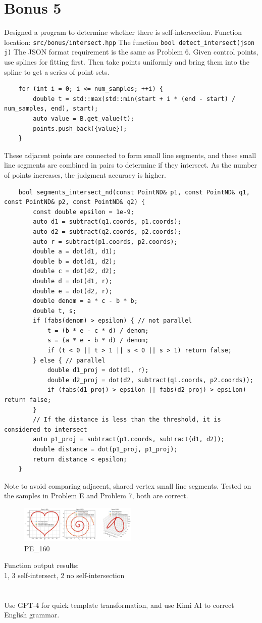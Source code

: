 \documentclass[a4paper]{article}
\begin{document}
\section*{Bonus 5}
Designed a program to determine whether there is self-intersection.
Function location: \texttt{src/bonus/intersect.hpp}
The function
\texttt{bool detect\_intersect(json j)}
The JSON format requirement is the same as Problem 6.
Given control points, use splines for fitting first.
Then take points uniformly and bring them into the spline to get a series of point sets.
\begin{verbatim}
    for (int i = 0; i <= num_samples; ++i) {
        double t = std::max(std::min(start + i * (end - start) / num_samples, end), start);
        auto value = B.get_value(t);
        points.push_back({value});
    }
\end{verbatim}
These adjacent points are connected to form small line segments, and these small line segments are combined in pairs to determine if they intersect.
As the number of points increases, the judgment accuracy is higher.
\begin{verbatim}
    bool segments_intersect_nd(const PointND& p1, const PointND& q1, const PointND& p2, const PointND& q2) {
        const double epsilon = 1e-9;
        auto d1 = subtract(q1.coords, p1.coords);
        auto d2 = subtract(q2.coords, p2.coords);
        auto r = subtract(p1.coords, p2.coords);
        double a = dot(d1, d1);
        double b = dot(d1, d2);
        double c = dot(d2, d2);
        double d = dot(d1, r);
        double e = dot(d2, r);
        double denom = a * c - b * b;
        double t, s;
        if (fabs(denom) > epsilon) { // not parallel
            t = (b * e - c * d) / denom;
            s = (a * e - b * d) / denom;   
            if (t < 0 || t > 1 || s < 0 || s > 1) return false;
        } else { // parallel
            double d1_proj = dot(d1, r);
            double d2_proj = dot(d2, subtract(q1.coords, p2.coords));
            if (fabs(d1_proj) > epsilon || fabs(d2_proj) > epsilon) return false;
        }
        // If the distance is less than the threshold, it is considered to intersect
        auto p1_proj = subtract(p1.coords, subtract(d1, d2));
        double distance = dot(p1_proj, p1_proj);
        return distance < epsilon;
    }
\end{verbatim}
Note to avoid comparing adjacent, shared vertex small line segments.
Tested on the samples in Problem E and Problem 7, both are correct.
\begin{figure}[H] 
    \centering
    \includegraphics[width=0.5\textwidth]{../figure/PE_160.png} 
    \caption{PE\_160} 
\end{figure}
Function output results:\\
1, 3 self-intersect, 2 no self-intersection\\



\section*{  }
    Use GPT-4 for quick template transformation, and use Kimi AI to correct English grammar.
    
\end{document}
